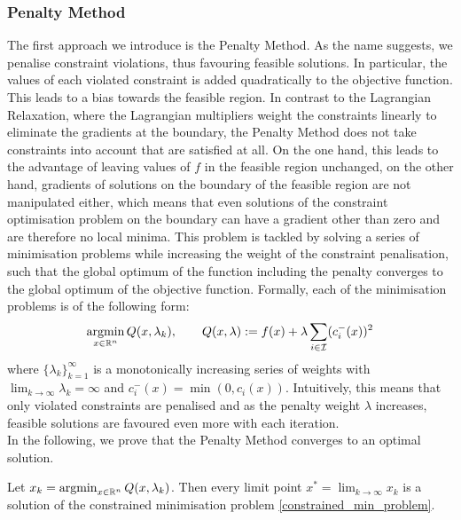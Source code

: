\subsubsection{Penalty Method}
The first approach we introduce is the Penalty Method. As the name suggests, we penalise constraint violations, thus favouring feasible solutions. In particular, the values of each violated constraint is added quadratically to the objective function. This leads to a bias towards the feasible region. In contrast to the Lagrangian Relaxation, where the Lagrangian multipliers weight the constraints linearly to eliminate the gradients at the boundary, the Penalty Method does not take constraints into account that are satisfied at all. On the one hand, this leads to the advantage of leaving values of $f$ in the feasible region unchanged, on the other hand, gradients of solutions on the boundary of the feasible region are not manipulated either, which means that even solutions of the constraint optimisation problem on the boundary can have a gradient other than zero and are therefore no local minima. This problem is tackled by solving a series of minimisation problems while increasing the weight of the constraint penalisation, such that the global optimum of the function including the penalty converges to the global optimum of the objective function. Formally, each of the minimisation problems is of the following form:
\[\operatorname*{argmin}_{x \in \mathbb{R}^n} Q(x, \lambda_k), \qquad Q(x, \lambda) := f(x) + \lambda \sum_{i \in \mathcal{I}} (c_i^{-}(x))^2\]
where $\{\lambda_k\}_{k=1}^\infty$ is a monotonically increasing series of weights with $\lim_{k \to \infty} \lambda_k = \infty$ and $c_i^-(x) = \min(0, c_i(x))$. Intuitively, this means that only violated constraints are penalised and as the penalty weight $\lambda$ increases, feasible solutions are favoured even more with each iteration.\\
In the following, we prove that the Penalty Method converges to an optimal solution.
\begin{theorem}
	Let $x_k = \operatorname*{argmin}_{x \in \mathbb{R}^n} Q(x, \lambda_k)$. Then every limit point $x^* = \lim_{k \to \infty} x_k$ is a solution of the constrained minimisation problem \eqref{constrained_min_problem}.
\end{theorem}
